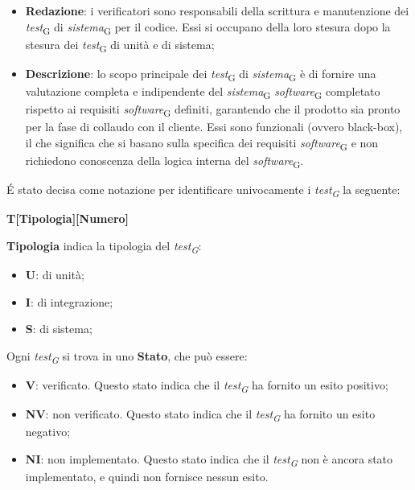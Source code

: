 \begin{itemize}
    \item \textbf{Redazione}: i verificatori sono responsabili della scrittura e manutenzione dei \textit{test}\textsubscript{G} di \textit{sistema}\textsubscript{G} per il codice. Essi si occupano della loro stesura dopo la stesura dei \textit{test}\textsubscript{G} di unità e di sistema;
    \item \textbf{Descrizione}: lo scopo principale dei \textit{test}\textsubscript{G} di \textit{sistema}\textsubscript{G} è di fornire una valutazione completa e indipendente del \textit{sistema}\textsubscript{G} \textit{software}\textsubscript{G} completato rispetto ai requisiti \textit{software}\textsubscript{G} definiti, garantendo che il prodotto sia pronto per la fase di collaudo con il cliente. Essi sono funzionali (ovvero black-box), il che significa che si basano sulla specifica dei requisiti \textit{software}\textsubscript{G} e non richiedono conoscenza della logica interna del \textit{software}\textsubscript{G}.
\end{itemize}

\'E stato decisa come notazione per identificare univocamente i \textit{test\textsubscript{G}} la seguente:
\begin{center}
    \textbf{T[Tipologia][Numero]}
\end{center}
\textbf{Tipologia} indica la tipologia del \textit{test\textsubscript{G}}:
\begin{itemize}
    \item \textbf{U}: di unità;
    \item \textbf{I}: di integrazione;
    \item \textbf{S}: di sistema;
\end{itemize}
Ogni \textit{test\textsubscript{G}} si trova in uno \textbf{Stato}, che può essere:
\begin{itemize}
    \item \textbf{V}: verificato. Questo stato indica che il \textit{test\textsubscript{G}} ha fornito un esito positivo;
    \item \textbf{NV}: non verificato. Questo stato indica che il \textit{test\textsubscript{G}} ha fornito un esito negativo;
    \item \textbf{NI}: non implementato. Questo stato indica che il \textit{test\textsubscript{G}} non è ancora stato implementato, e quindi non fornisce nessun esito.
\end{itemize}

